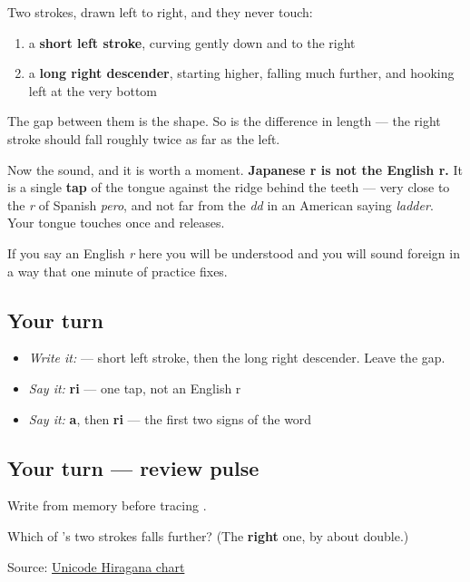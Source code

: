 Two strokes, drawn left to right, and they never touch:

\begin{enumerate}
\raggedright
  \item a \textbf{short left stroke}, curving gently down and to the right
  \item a \textbf{long right descender}, starting higher, falling much further, and hooking left at the very bottom
\end{enumerate}

The gap between them is the shape. So is the difference in length — the right stroke should fall roughly twice as far as the left.

Now the sound, and it is worth a moment. \textbf{Japanese r is not the English r.} It is a single \textbf{tap} of the tongue against the ridge behind the teeth — very close to the \emph{r} of Spanish \emph{pero}, and not far from the \emph{dd} in an American saying \emph{ladder}. Your tongue touches once and releases.

If you say an English \emph{r} here you will be understood and you will sound foreign in a way that one minute of practice fixes.

\subsection*{Your turn}
\begin{itemize}
\raggedright
  \item \emph{Write it:}  — short left stroke, then the long right descender. Leave the gap.
  \item \emph{Say it:} \textbf{ri} — one tap, not an English r
  \item \emph{Say it:} \textbf{a}, then \textbf{ri} — the first two signs of the word
\end{itemize}

\subsection*{Your turn — review pulse}
Write \textbf{} from memory before tracing \textbf{}.

\begin{tcolorbox}[breakable,colback=teal!4,colframe=teal!35!black,title={Before you move on}]
Which of 's two strokes falls further? (The \textbf{right} one, by about double.)

Source: \href{https://www.unicode.org/charts/PDF/U3040.pdf}{Unicode Hiragana chart}
\end{tcolorbox}
